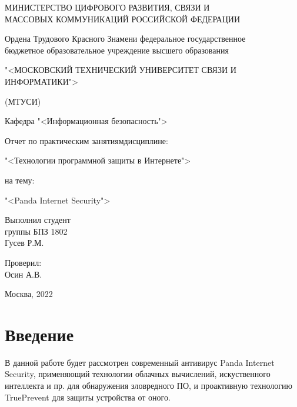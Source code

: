 

    \thispagestyle{empty}
    \begin{center}
        \begin{bfseries}
            \MakeUppercase{Министерство цифрового развития, связи и \\
            массовых коммуникаций Российской федерации}\par
            \bigskip
            Ордена Трудового Красного Знамени федеральное государственное \\
            бюджетное образовательное учреждение высшего образования\par
            \bigskip
            \MakeUppercase{"<Московский Технический Университет Связи И\\Информатики">}\par
            \bigskip
            (МТУСИ)\par\bigskip
        \end{bfseries}
        Кафедра "<Информационная безопасность">\par\bigskip\bigskip
        Отчет по практическим занятиям дисциплине:\par
        "<Технологии программной защиты в Интернете">\par
        на тему:\par"<Panda Internet Security">\par\bigskip
    \end{center}
    \begin{flushright}
        Выполнил студент\\группы БПЗ 1802\\ Гусев Р.М.\par
        \bigskip
        Проверил:\\Осин А.В.
    \end{flushright}
    \vspace*{\fill}
    { \center Москва, 2022}
    \pagebreak

    \tableofcontents

    \pagebreak

    \section*{Введение}
    В данной работе будет рассмотрен современный антивирус Panda Internet Security, применяющий
    технологии облачных вычислений, искуственного интеллекта и пр. для обнаружения зловредного ПО,
    и проактивную технологию TruePrevent для защиты устройства от оного.\par

